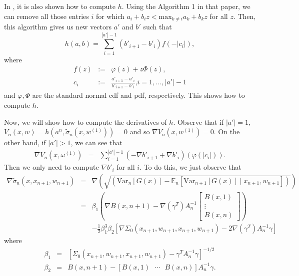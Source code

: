 \documentclass{article} %
\newcommand{\w}{w}
\begin{document}
In \cite{frazier2009knowledge}, it is also shown how to compute $h$. Using the Algorithm 1 in that paper, we can remove all those entries $i$ for which
$a_{i}+b_{i}z<\mbox{max}_{k\neq i}a_{k}+b_{k}z$ for all $z$. Then,
this algorithm gives us new vectors $a'$ and $b'$ such that
\[
h\left(a,b\right)=\sum_{i=1}^{\left|a'\right|-1}\left(b'_{i+1}-b'_{i}\right)f\left(-\left|c_{i}\right|\right),
\] 
where
\begin{eqnarray*}
f\left(z\right) & := & \varphi\left(z\right)+z\Phi\left(z\right),\\
c_{i} & := & \frac{a'_{i+1}-a'_{i}}{b'_{i+1}-b'_{i}}\mbox{,}i=1,\ldots,\left|a'\right|-1
\end{eqnarray*}
and $\varphi,\Phi$ are the standard normal cdf and pdf, respectively. This shows how to compute $h$.

Now, we will show how to compute the derivatives of $h$. Observe that if $\left|a'\right|=1$, $V_{n}\left(x,\w\right)=h\left(a^{n},\tilde{\sigma}_{n}\left(x,\w^{\left(1\right)}\right)\right)=0$
and so $\nabla V_{n}\left(x,\w^{\left(1\right)}\right)=0$. On
the other hand, if $\left|a'\right|>1$, we can see that
\begin{eqnarray*}
\nabla V_{n}\left(x,\omega^{\left(1\right)}\right) & = & \sum_{i=1}^{\left|a'\right|-1}\left(-\nabla b'_{i+1}+\nabla b'_{i}\right)\left(\varphi\left(\left|c_{i}\right|\right)\right).
\end{eqnarray*}
Then we only need to compute $\nabla b'_{i}$ for all $i$. To do this, we just observe that
\begin{eqnarray*}
\nabla\tilde{\sigma}_{n}\left(x,x_{n+1},\w_{n+1}\right) & = & \nabla\left(\sqrt{\left(\mbox{Var}_{n}\left[G\left(x\right)\right]-\mathbb{E}_{n}\left[\mbox{Var}_{n+1}\left[G\left(x\right)\right]\mid x_{n+1},\w_{n+1}\right]\right)}\right)\nonumber \\
 & = & \beta_{1}\left(\nabla B\left(x,n+1\right)-\nabla\left(\gamma^{T}\right)A_{n}^{-1}\left[\begin{array}{c}
B\left(x,1\right)\\
\vdots\\
B\left(x,n\right)
\end{array}\right]\right) \\
 &  & -\frac{1}{2}\beta_{1}^{3}\beta_{2}\left[\nabla\Sigma_{0}\left(x_{n+1},\w_{n+1},x_{n+1},\w_{n+1}\right)-2\nabla\left(\gamma^{T}\right)A_{n}^{-1}\gamma\right]  
\end{eqnarray*}
where 
\begin{eqnarray*}
\beta_{1} & = & \left[\Sigma_{0}\left(x_{n+1},\w_{n+1},x_{n+1},\w_{n+1}\right)-\gamma^{T}A_{n}^{-1}\gamma\right]^{-1/2}\\
\beta_{2} & = & B\left(x,n+1\right)-\left[B\left(x,1\right)\mbox{ }\cdots\mbox{ }B\left(x,n\right)\right]A_{n}^{-1}\gamma.
\end{eqnarray*}
\end{document}

